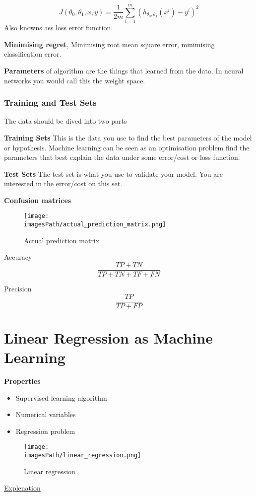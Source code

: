 \begin{equation*}
    J(\theta_0,\theta_1,x,y) = \frac{1}{2m}\sum_{i=1}^{m}(h_{\theta_0,\theta_1}(x^i)-y^i)^2
\end{equation*}
Also knowns ass loss error function.

\textbf{Minimising regret}, Minimising root mean square error, minimising
classification error.

\textbf{Parameters} of algorithm are the things that learned from the data. In
neural networks you would call this the weight space. 

\subsubsection{Training and Test Sets}
The data should be dived into two parts 

\textbf{Training Sets} This is the data you use to find the best parameters of the
model or hypothesis. Machine learning can be seen as an
optimisation problem find the parameters that best explain
the data under some error/cost or loss function.

\textbf{Test Sets} The test set is what you use to validate your model. You are
interested in the error/cost on this set.

\textbf{Confusion matrices}
\begin{figure}[!h]
    \centering
    \texttt{[image: \\imagesPath/actual\_prediction\_matrix.png]}
    \caption{Actual prediction matrix}
\end{figure}

Accuracy 
\begin{equation*}
    \frac{TP+TN}{TP+TN+TF+FN}
\end{equation*}

Precision 
\begin{equation*}
    \frac{TP}{TP+FP}
\end{equation*}

\newpage
\section{Linear Regression as Machine Learning}
\textbf{Properties}
\begin{itemize}
    \item Supervised learning algorithm
    \item Numerical variables 
    \item Regression problem
\end{itemize}
\begin{figure}[!h]
    \centering
    \texttt{[image: \\imagesPath/linear\_regression.png]}
    \caption{Linear regression}
\end{figure}
\href{https://www.youtube.com/watch?v=nk2CQITm_eo}{Explenation}


